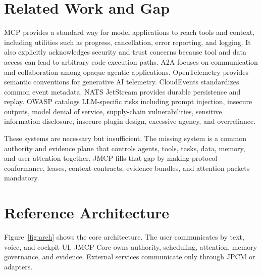 \documentclass[10pt,journal,onecolumn]{IEEEtran}
\begin{document}
\section{Related Work and Gap}
MCP provides a standard way for model applications to reach tools and context, including utilities such as progress, cancellation, error reporting, and logging. It also explicitly acknowledges security and trust concerns because tool and data access can lead to arbitrary code execution paths. A2A focuses on communication and collaboration among opaque agentic applications. OpenTelemetry provides semantic conventions for generative AI telemetry. CloudEvents standardizes common event metadata. NATS JetStream provides durable persistence and replay. OWASP catalogs LLM-specific risks including prompt injection, insecure outputs, model denial of service, supply-chain vulnerabilities, sensitive information disclosure, insecure plugin design, excessive agency, and overreliance.

These systems are necessary but insufficient. The missing system is a common authority and evidence plane that controls agents, tools, tasks, data, memory, and user attention together. JMCP fills that gap by making protocol conformance, leases, context contracts, evidence bundles, and attention packets mandatory.

\section{Reference Architecture}
Figure~\ref{fig:arch} shows the core architecture. The user communicates by text, voice, and cockpit UI. JMCP Core owns authority, scheduling, attention, memory governance, and evidence. External services communicate only through JPCM or adapters.
\end{document}
